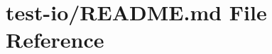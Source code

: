 \hypertarget{test-io_2README_8md}{\section{test-\/io/\-R\-E\-A\-D\-M\-E.md File Reference}
\label{test-io_2README_8md}
}
